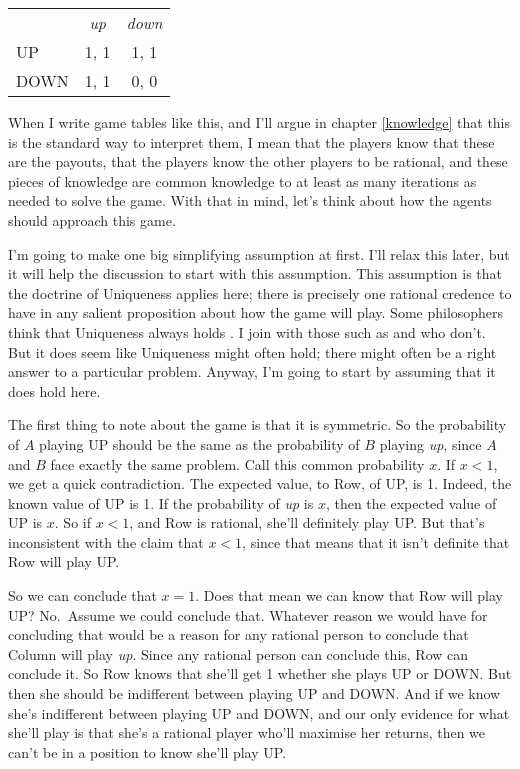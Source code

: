 \documentclass[11pt,]{book}
\def\toprule{}
\def\bottomrule{}
\begin{document}
\begin{longtable}[]{@{}lcc@{}}
\toprule
\endhead
& \emph{up} & \emph{down}\tabularnewline
UP & 1, 1 & 1, 1\tabularnewline
DOWN & 1, 1 & 0, 0\tabularnewline
\bottomrule
\end{longtable}

When I write game tables like this, and I'll argue in chapter \ref{knowledge} that this is the standard way to interpret them, I mean that the players know that these are the payouts, that the players know the other players to be rational, and these pieces of knowledge are common knowledge to at least as many iterations as needed to solve the game. With that in mind, let's think about how the agents should approach this game.

I'm going to make one big simplifying assumption at first. I'll relax this later, but it will help the discussion to start with this assumption. This assumption is that the doctrine of Uniqueness applies here; there is precisely one rational credence to have in any salient proposition about how the game will play. Some philosophers think that Uniqueness always holds \citep{White2005-WHIEP}. I join with those such as \citet{North2010} and \citet{Schoenfield2013} who don't. But it does seem like Uniqueness might often hold; there might often be a right answer to a particular problem. Anyway, I'm going to start by assuming that it does hold here.

The first thing to note about the game is that it is symmetric. So the probability of \(A\) playing UP should be the same as the probability of \(B\) playing \emph{up}, since \(A\) and \(B\) face exactly the same problem. Call this common probability \(x\). If \(x < 1\), we get a quick contradiction. The expected value, to Row, of UP, is 1. Indeed, the known value of UP is 1. If the probability of \emph{up} is \(x\), then the expected value of UP is \(x\). So if \(x < 1\), and Row is rational, she'll definitely play UP. But that's inconsistent with the claim that \(x < 1\), since that means that it isn't definite that Row will play UP.

So we can conclude that \(x = 1\). Does that mean we can know that Row will play UP? No.~Assume we could conclude that. Whatever reason we would have for concluding that would be a reason for any rational person to conclude that Column will play \emph{up}. Since any rational person can conclude this, Row can conclude it. So Row knows that she'll get 1 whether she plays UP or DOWN. But then she should be indifferent between playing UP and DOWN. And if we know she's indifferent between playing UP and DOWN, and our only evidence for what she'll play is that she's a rational player who'll maximise her returns, then we can't be in a position to know she'll play UP.
\end{document}
